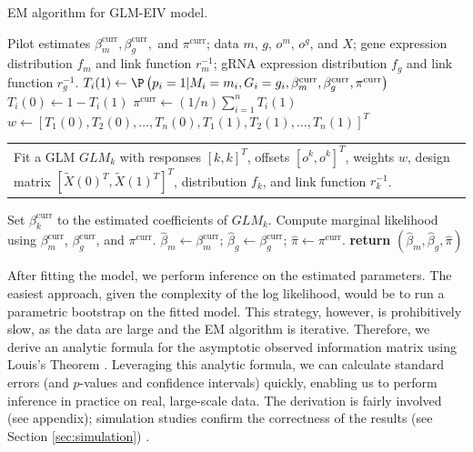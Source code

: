 \documentclass[12pt]{article}
\makeatletter
\newcommand{\multiline}[1]{%
	\begin{tabularx}{\dimexpr\linewidth-\ALG@thistlm}[t]{@{}X@{}}
		#1
	\end{tabularx}
}
\makeatother
\begin{document}
\begin{algorithm}
	\caption{EM algorithm for GLM-EIV model.}\label{algo:em_full}
	\begin{algorithmic}
		\Require Pilot estimates $\beta^\textrm{curr}_m, \beta^\textrm{curr}_g,$ and $\pi^\textrm{curr}$; data $m$, $g$, $o^m$, $o^g$, and $X$; gene expression distribution $f_m$ and link function $r^{-1}_m$; gRNA expression distribution $f_g$ and link function $r^{-1}_g$.  
			 
			\State $T_i(1) \gets \P\left(p_i = 1 |M_i = m_i, G_i = g_i, \beta_m^\textrm{curr}, \beta_g^\textrm{curr}, \pi^\textrm{curr} \right)$
			\State $T_i(0) \gets 1 - T_i(1)$
		 \EndFor
		 \State $\pi^{\textrm{curr}} \gets (1/n) \sum_{i=1}^n T_i(1)$ 
		 \State $w \gets [T_1(0), T_2(0), \dots, T_n(0), T_1(1), T_2(1), \dots, T_n(1)]^T$
		 \State  \multiline{ 
		 	Fit a GLM $GLM_k$ with responses $[k,k]^T$, offsets $[o^k, o^k]^T$, weights $w$, design matrix $[\tilde{X}(0)^T, \tilde{X}(1)^T]^T$, distribution $f_k$, and link function $r^{-1}_k$.
		}
		 \State Set $\beta_k^\textrm{curr}$ to the estimated coefficients of $GLM_k$.
		 \EndFor
		\State Compute marginal likelihood using $\beta_m^\textrm{curr}$, $\beta_g^\textrm{curr}$, and $\pi^\textrm{curr}$.
		\EndWhile
		\State $\hat{\beta}_m \gets \beta_m^\textrm{curr}$; $\hat{\beta}_g \gets \beta_g^\textrm{curr}$; $\hat{\pi} \gets \pi^\textrm{curr}$.
		\State \textbf{return} $(\hat{\beta}_m, \hat{\beta}_g, \hat{\pi})$
	\end{algorithmic}
\end{algorithm}

After fitting the model, we perform inference on the estimated parameters. The easiest approach, given the complexity of the log likelihood, would be to run a parametric bootstrap on the fitted model. This strategy, however, is prohibitively slow, as the data are large and the EM algorithm is iterative. Therefore, we derive an analytic formula for the asymptotic observed information matrix using Louis's Theorem \cite{Louis1982}. Leveraging this analytic formula, we can calculate standard errors (and $p$-values and confidence intervals) quickly, enabling us to perform inference in practice on real, large-scale data. The derivation is fairly involved (see appendix); simulation studies confirm the correctness of the results (see Section \ref{sec:simulation}) .
\end{document}
